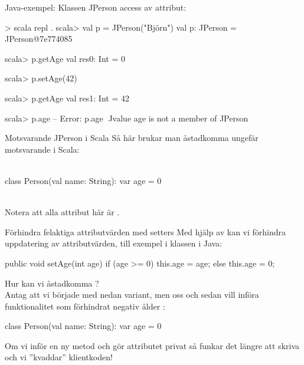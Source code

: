 \begin{Slide}{Java-exempel: Klassen JPerson}\SlideFontSmall
{} access av  attribut:
\vspace{-1em}\begin{multicols}{2}

\columnbreak

\begin{REPLnonum}[basicstyle=\SlideFontSize{7}{9}\ttfamily\color{white}]
> scala repl .
scala> val p = JPerson("Björn")
val p: JPerson = JPerson@7e774085

scala> p.getAge
val res0: Int = 0

scala> p.setAge(42)

scala> p.getAge
val res1: Int = 42

scala> p.age
-- Error:
p.age
^^^^^
value age is not a member of JPerson
\end{REPLnonum}
\end{multicols}
\end{Slide}


\begin{Slide}{Motsvarande JPerson i Scala}
Så här brukar man åstadkomma ungefär motsvarande i Scala: \\~
\begin{Code}[basicstyle=\SlideFontSize{12}{15}\ttfamily\selectfont]
class Person(val name: String):
  var age = 0
\end{Code}
~\\
Notera att alla attribut här är .
\end{Slide}


\begin{Slide}{Förhindra felaktiga attributvärden med setters}\SlideFontSmall
Med hjälp av \Emph{setters} kan vi förhindra \Alert{felaktig} uppdatering av attributvärden, till exempel  i klassen  i Java:
\begin{Code}[language=Java]
    public void setAge(int age){
        if (age >= 0) {
            this.age = age;
        } else {
            this.age = 0;
        }
    }
\end{Code}
Hur kan vi åstadkomma ? \\
\pause
Antag att vi började med nedan variant, men  oss och sedan vill införa funktionalitet som förhindrat negativ ålder :
\begin{Code}
class Person(val name: String):
  var age = 0
\end{Code}
Om vi inför en ny metod  och gör attributet  privat så funkar det  längre att skriva   och vi ''kvaddar'' klientkoden! \code{  :(}
\end{Slide}



